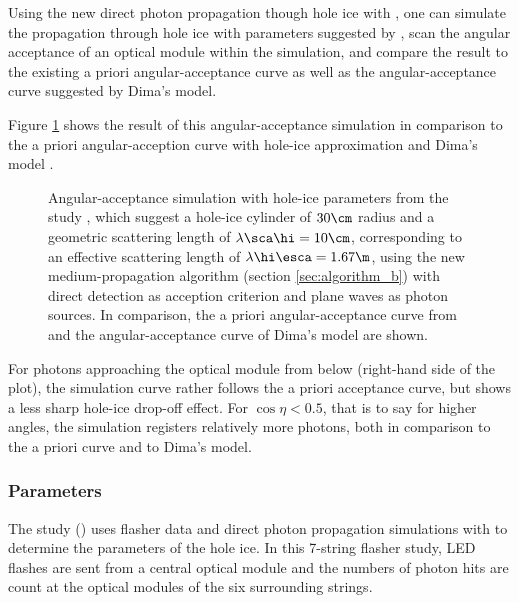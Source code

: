 Using the new direct photon propagation though hole ice with \clsim, one can simulate the propagation through hole ice with parameters suggested by , scan the angular acceptance of an optical module within the simulation, and compare the result to the existing a priori angular-acceptance curve as well as the angular-acceptance curve suggested by Dima's model.


Figure \ref{fig:eePai1sh} shows the result of this angular-acceptance simulation in comparison to the a priori angular-acception curve with hole-ice approximation \cite{icepaper} and Dima's model \cite{flasherdataderivedicemodels}.

\begin{figure}[htbp]
  \caption{Angular-acceptance simulation with hole-ice parameters from the  study \cite{martindardupdate}, which suggest a hole-ice cylinder of $30\cm$ radius and a geometric scattering length of $\lambda\sca\hi = 10\cm$, corresponding to an effective scattering length of $\lambda\hi\esca = 1.67\m$, using the new medium-propagation algorithm (section \ref{sec:algorithm_b}) with direct detection as acception criterion and plane waves as photon sources. In comparison, the a priori angular-acceptance curve from \cite{icepaper} and the angular-acceptance curve of Dima's model \cite{flasherdataderivedicemodels} are shown.}
  \label{fig:eePai1sh}
\end{figure}

For photons approaching the optical module from below (right-hand side of the plot), the simulation curve rather follows the a priori acceptance curve, but shows a less sharp hole-ice drop-off effect. For $\cos\eta < 0.5$, that is to say for higher angles, the simulation registers relatively more photons, both in comparison to the a priori curve and to Dima's model.


\subsubsection{ Parameters}
The  study () uses flasher data and direct photon propagation simulations with \ppc to determine the parameters of the hole ice. In this 7-string flasher study, LED flashes are sent from a central optical module and the numbers of photon hits are count at the optical modules of the six surrounding strings.

